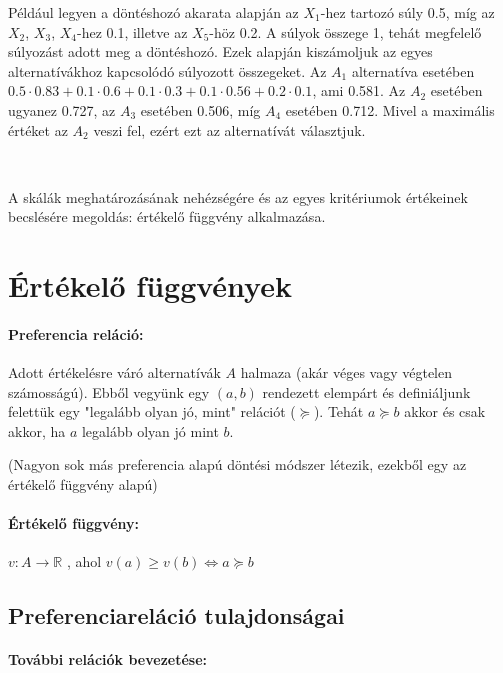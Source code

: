 \documentclass[a4paper,12pt]{article}
\begin{document}
Például legyen a döntéshozó akarata alapján az $X_1$-hez tartozó súly 0.5, míg az $X_2$, $X_3$, $X_4$-hez 0.1, illetve az $X_5$-höz 0.2. A súlyok összege 1, tehát megfelelő súlyozást adott meg a döntéshozó. Ezek alapján kiszámoljuk az egyes alternatívákhoz kapcsolódó súlyozott összegeket. Az $A_1$ alternatíva esetében $0.5\cdot0.83+0.1\cdot0.6+0.1\cdot0.3+0.1\cdot0.56+0.2\cdot0.1$, ami 0.581. Az $A_2$ esetében ugyanez 0.727, az $A_3$ esetében 0.506, míg $A_4$ esetében 0.712. Mivel a maximális értéket az $A_2$ veszi fel, ezért ezt az alternatívát választjuk. 


\

A skálák meghatározásának nehézségére és az egyes kritériumok értékeinek becslésére megoldás: értékelő függvény alkalmazása.

\section{Értékelő függvények}


\paragraph{Preferencia reláció: } Adott értékelésre váró alternatívák $A$ halmaza (akár véges vagy végtelen számosságú). Ebből vegyünk egy $(a,b)$ rendezett elempárt és definiáljunk felettük egy "legalább olyan jó, mint" relációt ($\succeq$). Tehát $a \succeq b$ akkor és csak akkor, ha $a$ legalább olyan jó mint $b$. 

\small{(Nagyon sok más preferencia alapú döntési módszer létezik, ezekből egy az értékelő függvény alapú)}

\paragraph{Értékelő függvény: }  $v: A \rightarrow \mathbb{R}$ , ahol $v(a) \geq v(b) \Leftrightarrow a \succeq b$

\subsection{Preferenciareláció tulajdonságai}

\paragraph{További relációk bevezetése:}
\end{document}
